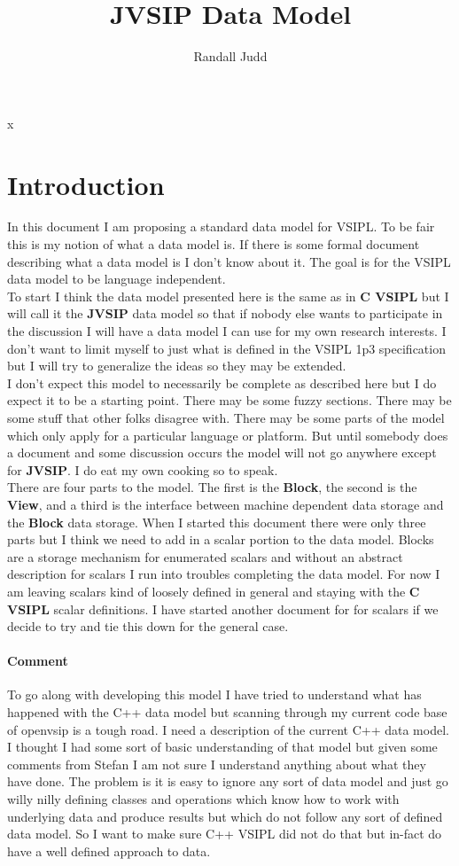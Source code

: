 \documentclass[11pt, oneside]{article}
\title{JVSIP Data Model}
\author{Randall Judd}
\newcommand{\cvl}{\ttbf{C VSIPL}}
\newcommand{\ttbf}[1]{{\ttfamily \bfseries #1}}
\newcommand{\jv}{{\ttbf{JVSIP}}}
\newcommand{\Blk}{\ttbf{Block}}
\newcommand{\Vw}{\ttbf{View}}
\begin{document}
x
\maketitle
 \section{Introduction}
 In this document I am proposing a standard data model for VSIPL. To be fair this is my notion of what a data model is. If there is some formal document describing what a data model is I don't know about it. The goal is for the VSIPL data model to be language independent.
\\[6pt]
To start I think the data model presented here is the same as in \cvl{} but I will call it the \jv{} data model so that if nobody else wants to participate in the discussion I will have a data model I can use for my own research interests.  I don't want to limit myself to just what is defined in the VSIPL 1p3 specification but I will try to generalize the ideas so they may be extended.
\\[6pt]
I don't expect this model to necessarily be complete as described here but I do expect it to be a starting point.  There may be some fuzzy sections. There may be some stuff that other folks disagree with. There may be some parts of the model which only apply for a particular language or platform.  But until somebody does a document and some discussion occurs the model will not go anywhere except for \jv.  I do eat my own cooking so to speak.
\\[6pt]
There are four parts to the model. The first is the \Blk{}, the second is the \Vw{}, and a third is the interface between machine dependent data storage and the \Blk{} data storage. When I started this document there were only three parts but I think we need to add in a scalar portion to the data model. Blocks are a storage mechanism for enumerated scalars and without an abstract description for scalars I run into troubles completing the data model. For now I am leaving scalars kind of loosely defined in general and staying with the \cvl{} scalar definitions.  I have started another document for for scalars if we decide to try and tie this down for the general case.
\paragraph{Comment} To go along with developing this model I have tried to understand what has happened with the C++ data model but scanning through my current code base of openvsip is a tough road. I need a description of the current C++ data model.  I thought I had some sort of basic understanding of that model but given some comments from Stefan I am not sure I understand anything about what they have done. The problem is it is easy to ignore any sort of data model and just go willy nilly defining classes and operations which know how to work with underlying data and produce results but which do not follow any sort of defined data model. So I want to make sure C++ VSIPL did not do that but in-fact do have a well defined approach to data.
\end{document}
